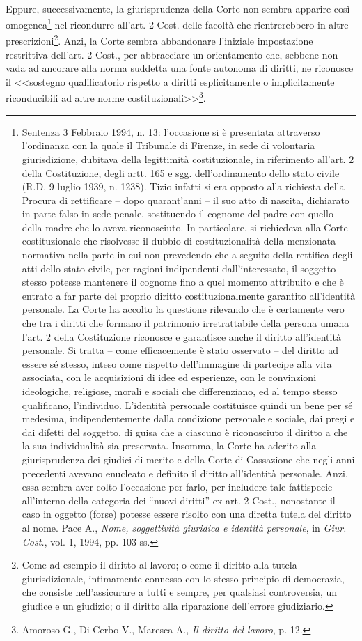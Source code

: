 \\Eppure, successivamente, la giurisprudenza della Corte non sembra apparire così omogenea\footnote{Sentenza 3 Febbraio 1994, n. 13: l’occasione si è presentata attraverso l’ordinanza con la quale il Tribunale di Firenze, in sede di volontaria giurisdizione, dubitava della legittimità costituzionale, in riferimento all’art. 2 della Costituzione, degli artt. 165 e sgg. dell'ordinamento dello stato civile (R.D. 9 luglio 1939, n. 1238). Tizio infatti si era opposto alla richiesta della Procura di rettificare – dopo quarant’anni – il suo atto di nascita, dichiarato in parte falso in sede penale, sostituendo il cognome del padre con quello della madre che lo aveva riconosciuto. In particolare, si richiedeva alla Corte costituzionale che risolvesse il dubbio di costituzionalità della menzionata normativa nella parte in cui non prevedendo che a seguito della rettifica degli atti dello stato civile, per ragioni indipendenti dall'interessato, il soggetto stesso potesse mantenere il cognome fino a quel momento attribuito e che è entrato a far parte del proprio diritto costituzionalmente garantito all'identità personale. La Corte ha accolto la questione rilevando che è certamente vero che tra i diritti che formano il patrimonio irretrattabile della persona umana l'art. 2 della Costituzione riconosce e garantisce anche il diritto all'identità personale. Si tratta – come efficacemente è stato osservato – del diritto ad essere sé stesso, inteso come rispetto dell'immagine di partecipe alla vita associata, con le acquisizioni di idee ed esperienze, con le convinzioni ideologiche, religiose, morali e sociali che differenziano, ed al tempo stesso qualificano, l'individuo. L'identità personale costituisce quindi un bene per sé medesima, indipendentemente dalla condizione personale e sociale, dai pregi e dai difetti del soggetto, di guisa che a ciascuno è riconosciuto il diritto a che la sua individualità sia preservata. Insomma, la Corte ha aderito alla giurisprudenza dei giudici di merito e della Corte di Cassazione che negli anni precedenti avevano enucleato e definito il diritto all’identità personale. Anzi, essa sembra aver colto l’occasione per farlo, per includere tale fattispecie all’interno della categoria dei “nuovi diritti” ex art. 2 Cost., nonostante il caso in oggetto (forse) potesse essere risolto con una diretta tutela del diritto al nome. Pace A., \textit{Nome, soggettività giuridica e identità personale}, in \textit{Giur. Cost.}, vol. 1, 1994, pp. 103 ss.} nel ricondurre all’art. 2 Cost. delle facoltà che rientrerebbero in altre prescrizioni\footnote{Come ad esempio il diritto al lavoro; o come il diritto alla tutela giurisdizionale, intimamente connesso con lo stesso principio di democrazia, che consiste nell’assicurare a tutti e sempre, per qualsiasi controversia, un giudice e un giudizio; o il diritto alla riparazione dell’errore giudiziario.}. Anzi, la Corte sembra abbandonare l’iniziale impostazione restrittiva dell’art. 2 Cost., per abbracciare un orientamento che, sebbene non vada ad ancorare alla norma suddetta una fonte autonoma di diritti, ne riconosce il <<sostegno qualificatorio rispetto a diritti esplicitamente o implicitamente riconducibili ad altre norme costituzionali>>\footnote{Amoroso G., Di Cerbo V., Maresca A., \textit{Il diritto del lavoro}, p. 12.}.
